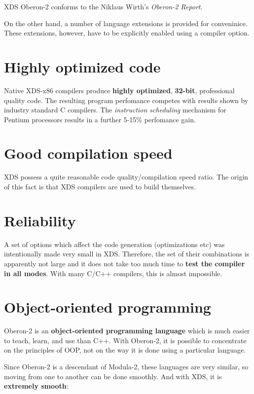    XDS Oberon-2 conforms to the Niklaus Wirth's {\em Oberon-2 Report}.

   On the other hand, a number of language extensions is
   provided for conveninice. These extensions, however, have to be
   explicitly enabled using a compiler option.

\section{Highly optimized code}
\label{feat:optimization}

   Native XDS-x86 compilers produce {\bf highly optimized}, {\bf 32-bit},
   professional quality code. The resulting program perfomance competes
   with results shown by industry standard C compilers. The 
   {\em instruction scheduling} mechanism for Pentium processors
   results in a further 5-15\% perfomance gain.

\section{Good compilation speed}
\label{feat:speed}

   XDS possess a quite reasonable code quality/compilation speed ratio.
   The origin of this fact is that XDS compilers are used to build themselves.

\section{Reliability}
\label{feat:reliability}

   A set of options which affect the code generation (optimizations etc)
   was intentionally made very small in XDS. Therefore, the set of their
   combinations is apparently not large and it does not take too much
   time to {\bf test the compiler in all modes}. With many C/C++ compilers, 
   this is almost impossible.

\section{Object-oriented programming}
\label{feat:OOP}

   Oberon-2 is an {\bf object-oriented programming language} which is much easier
   to teach, learn, and use than C++. With Oberon-2, it is possible to
   concentrate on the principles of OOP, not on the way it is done using a
   particular language.

   Since Oberon-2 is a descendant of Modula-2, these languages are very similar,
   so moving from one to another can be done smoothly. And with XDS, it is
   {\bf extremely smooth}:

